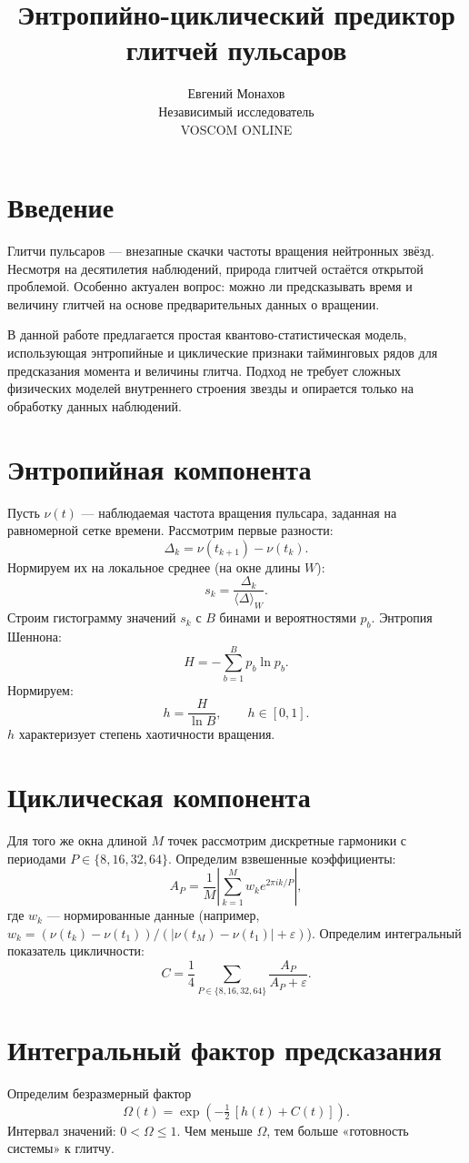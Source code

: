 \documentclass[a4paper,12pt]{article}
\title{Энтропийно-циклический предиктор глитчей пульсаров}
\author{Евгений Монахов \\ Независимый исследователь \\ VOSCOM ONLINE}
\date{}
\begin{document}
\maketitle

\section{Введение}
Глитчи пульсаров --- внезапные скачки частоты вращения нейтронных звёзд. 
Несмотря на десятилетия наблюдений, природа глитчей остаётся открытой проблемой. 
Особенно актуален вопрос: можно ли предсказывать время и величину глитчей на основе 
предварительных данных о вращении.

В данной работе предлагается простая квантово-статистическая модель, 
использующая энтропийные и циклические признаки тайминговых рядов для предсказания 
момента и величины глитча. 
Подход не требует сложных физических моделей внутреннего строения звезды и 
опирается только на обработку данных наблюдений.

\section{Энтропийная компонента}
Пусть $\nu(t)$ --- наблюдаемая частота вращения пульсара, заданная на равномерной сетке времени. 
Рассмотрим первые разности:
\[
\Delta_k = \nu(t_{k+1}) - \nu(t_k).
\]
Нормируем их на локальное среднее (на окне длины $W$):
\[
s_k = \frac{\Delta_k}{\langle \Delta \rangle_W}.
\]
Строим гистограмму значений $s_k$ с $B$ бинами и вероятностями $p_b$. 
Энтропия Шеннона:
\[
H = - \sum_{b=1}^B p_b \ln p_b.
\]
Нормируем:
\[
h = \frac{H}{\ln B}, \qquad h \in [0,1].
\]
$h$ характеризует степень хаотичности вращения.

\section{Циклическая компонента}
Для того же окна длиной $M$ точек рассмотрим дискретные гармоники с периодами 
$P \in \{8,16,32,64\}$. Определим взвешенные коэффициенты:
\[
A_P = \frac{1}{M} \left| \sum_{k=1}^M w_k e^{2\pi i k / P} \right|,
\]
где $w_k$ --- нормированные данные (например, $w_k = (\nu(t_k)-\nu(t_1))/(|\nu(t_M)-\nu(t_1)|+\varepsilon)$).
Определим интегральный показатель цикличности:
\[
C = \frac{1}{4}\sum_{P \in \{8,16,32,64\}} \frac{A_P}{A_P+\varepsilon}.
\]

\section{Интегральный фактор предсказания}
Определим безразмерный фактор
\[
\Omega(t) = \exp\left(-\tfrac12 \,[h(t) + C(t)]\right).
\]
Интервал значений: $0 < \Omega \leq 1$. 
Чем меньше $\Omega$, тем больше «готовность системы» к глитчу.
\end{document}
